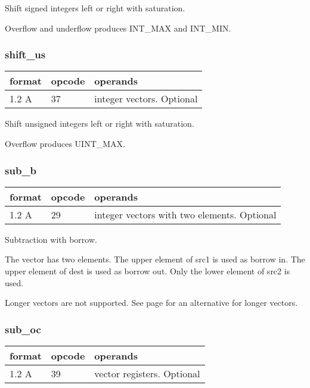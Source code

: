 \documentclass[forwardcom.tex]{subfiles}
\begin{document}
Shift signed integers left or right with saturation.

Overflow and underflow produces INT\_MAX and INT\_MIN.

\subsubsection{shift\_us}
\label{table:shiftUsInstruction}
\begin{tabular}{|p{12mm}|p{12mm}|p{110mm}|}
\hline
\bfseries format & \bfseries opcode & \bfseries operands \\ \hline
1.2 A & 37 & integer vectors. Optional \\ \hline
\end{tabular}
\vspace{2mm}

Shift unsigned integers left or right with saturation.

Overflow produces UINT\_MAX.

\subsubsection{sub\_b}
\label{table:subBInstruction}
\begin{tabular}{|p{12mm}|p{12mm}|p{110mm}|}
\hline
\bfseries format & \bfseries opcode & \bfseries operands \\ \hline
1.2 A & 29 & integer vectors with two elements. Optional \\ \hline
\end{tabular}
\vspace{2mm}

Subtraction with borrow.
\vspace{2mm}

The vector has two elements. The upper element of src1 is used as borrow in. The upper element of dest is used as borrow out. Only the lower element of src2 is used.
\vspace{2mm}

Longer vectors are not supported. See page 
\pageref{highPrecisionArithmetic} for an alternative for longer vectors.

\subsubsection{sub\_oc}
\label{table:subOcInstruction}
\begin{tabular}{|p{12mm}|p{12mm}|p{110mm}|}
\hline
\bfseries format & \bfseries opcode & \bfseries operands \\ \hline
1.2 A & 39 & vector registers. Optional \\ \hline
\end{tabular}
\vspace{2mm}
\end{document}
